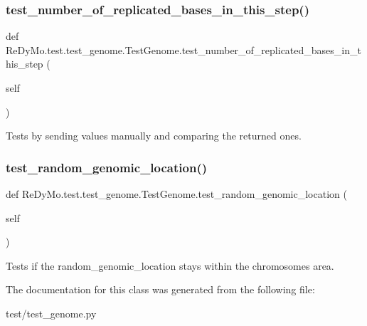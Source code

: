 \subsubsection{\texorpdfstring{test\+\_\+number\+\_\+of\+\_\+replicated\+\_\+bases\+\_\+in\+\_\+this\+\_\+step()}{test\_number\_of\_replicated\_bases\_in\_this\_step()}}
{\footnotesize\ttfamily def Re\+Dy\+Mo.\+test.\+test\+\_\+genome.\+Test\+Genome.\+test\+\_\+number\+\_\+of\+\_\+replicated\+\_\+bases\+\_\+in\+\_\+this\+\_\+step (\begin{DoxyParamCaption}\item[{}]{self }\end{DoxyParamCaption})}



Tests by sending values manually and comparing the returned ones. 

\mbox{\label{classReDyMo_1_1test_1_1test__genome_1_1TestGenome_a9d1148ac068b11c35cd1d67139b78bfd}} 
\subsubsection{\texorpdfstring{test\+\_\+random\+\_\+genomic\+\_\+location()}{test\_random\_genomic\_location()}}
{\footnotesize\ttfamily def Re\+Dy\+Mo.\+test.\+test\+\_\+genome.\+Test\+Genome.\+test\+\_\+random\+\_\+genomic\+\_\+location (\begin{DoxyParamCaption}\item[{}]{self }\end{DoxyParamCaption})}



Tests if the random\+\_\+genomic\+\_\+location stays within the chromosomes\textquotesingle{} area. 



The documentation for this class was generated from the following file\+:\begin{DoxyCompactItemize}
\item 
test/test\+\_\+genome.\+py\end{DoxyCompactItemize}
